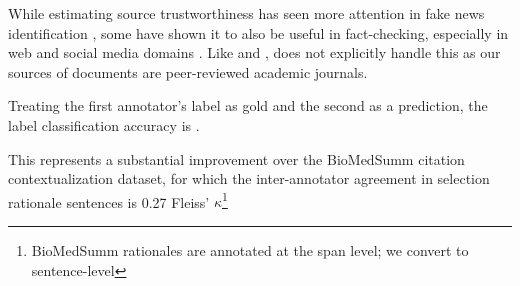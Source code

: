 

While estimating source trustworthiness has seen more attention in fake news identification \cite{baly-etal-2018-predicting}, some have shown it to also be useful in fact-checking, especially in web and social media domains \cite{Popat2017WhereTT,Nguyen2018AnIJ}.  Like \fever and \snopes, \ours does not explicitly handle this as our sources of documents are peer-reviewed academic journals.









% 





Treating the first annotator's label as gold and the second as a prediction, the label classification accuracy is . 





This represents a substantial improvement over the BioMedSumm citation contextualization dataset, for which the inter-annotator agreement in selection rationale sentences is 0.27 Fleiss' $\kappa$\footnote{BioMedSumm rationales are annotated at the span level; we convert to sentence-level }